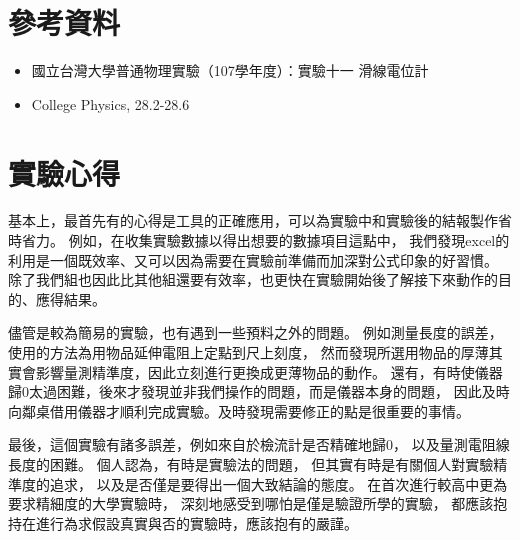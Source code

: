 \documentclass[12pt]{article}
\begin{document}
    \section{參考資料}

        \begin{itemize}
            \item 國立台灣大學普通物理實驗（107學年度）：實驗十一 滑線電位計
            \item College Physics, 28.2-28.6 
        \end{itemize}
        
    \section{實驗心得}
    
    基本上，最首先有的心得是工具的正確應用，可以為實驗中和實驗後的結報製作省時省力。
    例如，在收集實驗數據以得出想要的數據項目這點中，
    我們發現excel的利用是一個既效率、又可以因為需要在實驗前準備而加深對公式印象的好習慣。
    除了我們組也因此比其他組還要有效率，也更快在實驗開始後了解接下來動作的目的、應得結果。

    儘管是較為簡易的實驗，也有遇到一些預料之外的問題。
    例如測量長度的誤差，使用的方法為用物品延伸電阻上定點到尺上刻度，
    然而發現所選用物品的厚薄其實會影響量測精準度，因此立刻進行更換成更薄物品的動作。
    還有，有時使儀器歸0太過困難，後來才發現並非我們操作的問題，而是儀器本身的問題，
    因此及時向鄰桌借用儀器才順利完成實驗。及時發現需要修正的點是很重要的事情。

    最後，這個實驗有諸多誤差，例如來自於檢流計是否精確地歸0，
    以及量測電阻線長度的困難。
    個人認為，有時是實驗法的問題，
    但其實有時是有關個人對實驗精準度的追求，
    以及是否僅是要得出一個大致結論的態度。
    在首次進行較高中更為要求精細度的大學實驗時，
    深刻地感受到哪怕是僅是驗證所學的實驗，
    都應該抱持在進行為求假設真實與否的實驗時，應該抱有的嚴謹。 
        
\end{document}
